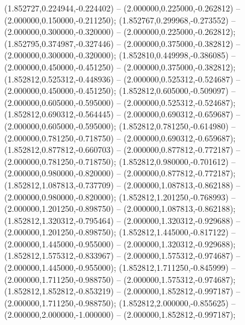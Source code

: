  (1.852727,0.224944,-0.224402) -- (2.000000,0.225000,-0.262812) -- (2.000000,0.150000,-0.211250);
 (1.852767,0.299968,-0.273552) -- (2.000000,0.300000,-0.320000) -- (2.000000,0.225000,-0.262812);
 (1.852795,0.374987,-0.327446) -- (2.000000,0.375000,-0.382812) -- (2.000000,0.300000,-0.320000);
 (1.852810,0.449998,-0.386085) -- (2.000000,0.450000,-0.451250) -- (2.000000,0.375000,-0.382812);
 (1.852812,0.525312,-0.448936) -- (2.000000,0.525312,-0.524687) -- (2.000000,0.450000,-0.451250);
 (1.852812,0.605000,-0.509097) -- (2.000000,0.605000,-0.595000) -- (2.000000,0.525312,-0.524687);
 (1.852812,0.690312,-0.564445) -- (2.000000,0.690312,-0.659687) -- (2.000000,0.605000,-0.595000);
 (1.852812,0.781250,-0.614980) -- (2.000000,0.781250,-0.718750) -- (2.000000,0.690312,-0.659687);
 (1.852812,0.877812,-0.660703) -- (2.000000,0.877812,-0.772187) -- (2.000000,0.781250,-0.718750);
 (1.852812,0.980000,-0.701612) -- (2.000000,0.980000,-0.820000) -- (2.000000,0.877812,-0.772187);
 (1.852812,1.087813,-0.737709) -- (2.000000,1.087813,-0.862188) -- (2.000000,0.980000,-0.820000);
 (1.852812,1.201250,-0.768993) -- (2.000000,1.201250,-0.898750) -- (2.000000,1.087813,-0.862188);
 (1.852812,1.320312,-0.795464) -- (2.000000,1.320312,-0.929688) -- (2.000000,1.201250,-0.898750);
 (1.852812,1.445000,-0.817122) -- (2.000000,1.445000,-0.955000) -- (2.000000,1.320312,-0.929688);
 (1.852812,1.575312,-0.833967) -- (2.000000,1.575312,-0.974687) -- (2.000000,1.445000,-0.955000);
 (1.852812,1.711250,-0.845999) -- (2.000000,1.711250,-0.988750) -- (2.000000,1.575312,-0.974687);
 (1.852812,1.852812,-0.853219) -- (2.000000,1.852812,-0.997187) -- (2.000000,1.711250,-0.988750);
 (1.852812,2.000000,-0.855625) -- (2.000000,2.000000,-1.000000) -- (2.000000,1.852812,-0.997187);
